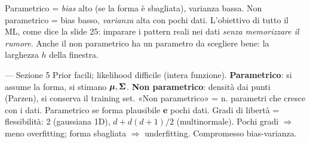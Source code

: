 
\begin{mlbox}
Parametrico = \emph{bias} alto (se la forma è sbagliata), varianza bassa. Non parametrico = bias basso, \emph{varianza} alta con pochi dati. L'obiettivo di tutto il ML, come dice la slide 25: imparare i pattern reali nei dati \emph{senza memorizzare il rumore}. Anche il non parametrico ha un parametro da scegliere bene: la larghezza $h$ della finestra.
\end{mlbox}

\begin{appunti}{— Sezione 5}
 Prior facili; likelihood difficile (intera funzione). \textbf{Parametrico}: si assume la forma, si stimano $\bm{\mu},\bm{\Sigma}$. \textbf{Non parametrico}: densità dai punti (Parzen), si conserva il training set. «Non parametrico» = n. parametri che cresce con i dati.
 Parametrico se forma plausibile \textbf{e} pochi dati. Gradi di libertà = flessibilità: 2 (gaussiana 1D), $d+d(d+1)/2$ (multinormale). Pochi gradi $\Rightarrow$ meno overfitting; forma sbagliata $\Rightarrow$ underfitting. Compromesso bias-varianza.
\end{appunti}
